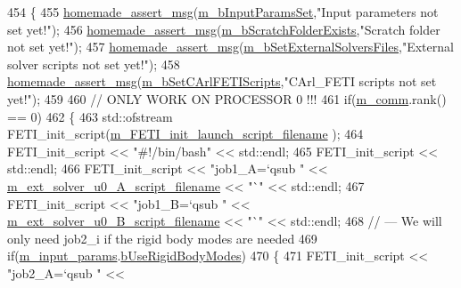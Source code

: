 \begin{DoxyCode}
454 \{
455     \hyperlink{common__header_8h_a593ccc80b790b2268653fcf6597bf451}{homemade\_assert\_msg}(\hyperlink{classcarl_1_1_solver___files___setup_a7187af3c4a90be2d8ad2a25c11c0e910}{m\_bInputParamsSet},\textcolor{stringliteral}{"Input parameters not set
       yet!"});
456     \hyperlink{common__header_8h_a593ccc80b790b2268653fcf6597bf451}{homemade\_assert\_msg}(\hyperlink{classcarl_1_1_solver___files___setup_ac59627eab870e65887560595d0fbc025}{m\_bScratchFolderExists},\textcolor{stringliteral}{"Scratch folder not
       set yet!"});
457     \hyperlink{common__header_8h_a593ccc80b790b2268653fcf6597bf451}{homemade\_assert\_msg}(\hyperlink{classcarl_1_1_solver___files___setup_ad93c68f661273a66d319906dbfe080b5}{m\_bSetExternalSolversFiles},\textcolor{stringliteral}{"External
       solver scripts not set yet!"});
458     \hyperlink{common__header_8h_a593ccc80b790b2268653fcf6597bf451}{homemade\_assert\_msg}(\hyperlink{classcarl_1_1_solver___files___setup_a53cf1256ea7a5f375a887d91ddd2ec9a}{m\_bSetCArlFETIScripts},\textcolor{stringliteral}{"CArl\_FETI scripts
       not set yet!"});
459 
460     \textcolor{comment}{// ONLY WORK ON PROCESSOR 0 !!!}
461     \textcolor{keywordflow}{if}(\hyperlink{classcarl_1_1_solver___files___setup_aa8049195d5e383a0ca4295795e3f5751}{m\_comm}.rank() == 0)
462     \{
463         std::ofstream FETI\_init\_script(\hyperlink{classcarl_1_1_solver___files___setup_a2d9e182d84170579a5f605319258360f}{m\_FETI\_init\_launch\_script\_filename}
      );
464         FETI\_init\_script << \textcolor{stringliteral}{"#!/bin/bash"} << std::endl;
465         FETI\_init\_script << std::endl;
466         FETI\_init\_script << \textcolor{stringliteral}{"job1\_A=`qsub "} << \hyperlink{classcarl_1_1_solver___files___setup_ac870acbdb942520edc49f0935605dd0b}{m\_ext\_solver\_u0\_A\_script\_filename}
       << \textcolor{stringliteral}{"`"} << std::endl;
467         FETI\_init\_script << \textcolor{stringliteral}{"job1\_B=`qsub "} << \hyperlink{classcarl_1_1_solver___files___setup_a890a41a7fb4b1130eb9fe558a9509af2}{m\_ext\_solver\_u0\_B\_script\_filename}
       << \textcolor{stringliteral}{"`"} << std::endl;
468         \textcolor{comment}{// --- We will only need job2\_i if the rigid body modes are needed}
469         \textcolor{keywordflow}{if}(\hyperlink{classcarl_1_1_solver___files___setup_aa5804bf6c6e506b382766333f232d3d5}{m\_input\_params}.\hyperlink{structcarl_1_1feti__setup__init__params_af4191df4632d21bed2b302c08d113d14}{bUseRigidBodyModes})
470         \{
471             FETI\_init\_script << \textcolor{stringliteral}{"job2\_A=`qsub "} << 

\end{DoxyCode}
